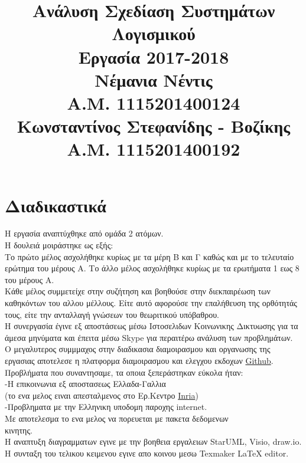 \documentclass[12pt]{article}
\title{{Ανάλυση Σχεδίαση Συστημάτων Λογισμικού} \\
\vspace{2cm}
{\Huge Εργασία 2017-2018} \\
\vspace{2cm}
{Νέμανια Νέντις}\\
{Α.Μ. 1115201400124}\\
{Κωνσταντίνος Στεφανίδης - Βοζίκης}\\
{Α.Μ. 1115201400192}}
\date{}
\newcommand\tab[1][1cm]{\hspace*{#1}}
\begin{document}
\maketitle
\newpage
\tableofcontents
\newpage

\section{Διαδικαστικά}
Η εργασία αναπτύχθηκε από ομάδα 2 ατόμων.\\
\tab Η δουλειά μοιράστηκε ως εξής:\\ 
\tab Το πρώτο μέλος ασχολήθηκε κυρίως με τα μέρη Β και Γ καθώς και με το τελευταίο ερώτημα του μέρους Α. Το άλλο μέλος ασχολήθηκε κυρίως με τα ερωτήματα 1 εως 8 
του μέρους Α.\\
\tab Κάθε μέλος συμμετείχε στην συζήτηση και βοηθούσε στην διεκπαιρέωση των καθηκόντων του αλλου μέλλους. Είτε αυτό αφορούσε την επαλήθευση της ορθότητάς τους, είτε την ανταλλαγή γνώσεων του θεωριτικού υπόβαθρου.\\
\tab Η συνεργασία έγινε εξ αποστάσεως μέσω Ιστοσελιδων Κοινωνικης Δικτυωσης για τα άμεσα μηνύματα και έπειτα μέσω \textlatin{Skype} για περαιτέρω ανάλυση των προβλημάτων.\\
\tab Ο μεγαλυτερος συμμμαχος στην διαδικασια διαμοιρασμου και οργανωσης της εργασιας αποτελεσε η πλατφορμα διαμοιρασμου και ελεγχου εκδοχων \href{https://github.com/}{\textlatin{Github}}.\\
\tab Προβλήματα που συναντησαμε, τα οποια ξεπεράστηκαν εύκολα ήταν:\\
\tab\tab -Η επικοινωνια εξ αποστασεως Ελλαδα-Γαλλια\\
\tab\tab (το ενα μελος ειναι απεσταλμενος στο Ερ.Κεντρο \href{https://www.inria.fr/en/}{\textlatin{Inria}})\\
\tab\tab -Προβληματα με την Ελληνικη υποδομη παροχης \textlatin{internet}.\\
\tab\tab Με αποτελεσμα το ενα μελος να πορευεται με πακετα δεδομενων\\ \tab\tab κινητης.\\
\tab Η αναπτυξη διαγραμματων εγινε με την βοηθεια εργαλειων \textlatin{StarUML, Visio, draw.io}.\\
\tab Η συνταξη του τελικου κειμενου εγινε απο κοινου μεσω \textlatin{Texmaker LaTeX editor}.


\newpage
\end{document}
